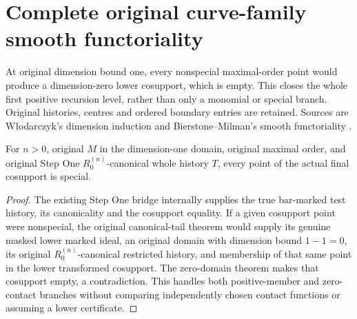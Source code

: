 \section{Complete original curve-family smooth functoriality}

At original dimension bound one, every nonspecial maximal-order point would
produce a dimension-zero lower cosupport, which is empty. This closes the
whole first positive recursion level, rather than only a monomial or special
branch. Original histories, centres and ordered boundary entries are retained.
Sources are W\l odarczyk's dimension induction and Bierstone--Milman's smooth
functoriality \cite{wlodarczyk05-hironaka,bierstone-milman08-functoriality}.

\begin{theorem}
\label{hir:smooth-original-curve-step-one-special}
\leanok
{}
For $n>0$, original $M$ in the dimension-one domain, original maximal
order, and original Step One $R^{(n)}_0$-canonical whole history $T$, every
point of the actual final cosupport is special.
\end{theorem}
\begin{proof}
The existing Step One bridge internally supplies the true bar-marked test
history, its canonicality and the cosupport equality. If a given cosupport
point were nonspecial, the original canonical-tail theorem would supply
its genuine masked lower marked ideal, an original domain with dimension
bound $1-1=0$, its original $R^{(n)}_0$-canonical restricted history, and
membership of that same point in the lower transformed cosupport. The
zero-domain theorem makes that cosupport empty, a contradiction. This
handles both positive-member and zero-contact branches without comparing
independently chosen contact functions or assuming a lower certificate.
\end{proof}


